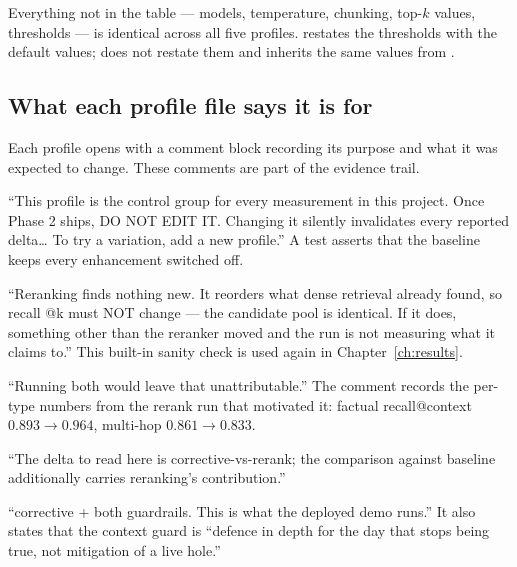 Everything not in the table --- models, temperature, chunking, top-$k$ values, thresholds --- is identical across all five profiles.  restates the thresholds with the default values;  does not restate them and inherits the same values from .

\subsection{What each profile file says it is for}

Each profile opens with a comment block recording its purpose and what it was expected to change. These comments are part of the evidence trail.

\begin{description}[style=nextline]
  \item[\code{baseline} --- the frozen control.] \enquote{This profile is the control group for every measurement in this project. Once Phase 2 ships, DO NOT EDIT IT. Changing it silently invalidates every reported delta\ldots{} To try a variation, add a new profile.} A test asserts that the baseline keeps every enhancement switched off.
  \item[\code{rerank} --- one flag.] \enquote{Reranking finds nothing new. It reorders what dense retrieval already found, so recall @k must NOT change --- the candidate pool is identical. If it does, something other than the reranker moved and the run is not measuring what it claims to.} This built-in sanity check is used again in Chapter~\ref{ch:results}.
  \item[\code{decompose} --- one flag, reranker deliberately off.] \enquote{Running both would leave that unattributable.} The comment records the per-type numbers from the rerank run that motivated it: factual recall@context $0.893 \rightarrow 0.964$, multi-hop $0.861 \rightarrow 0.833$.
  \item[\code{corrective} --- built on \code{rerank}.] \enquote{The delta to read here is corrective-vs-rerank; the comparison against baseline additionally carries reranking's contribution.}
  \item[\code{guarded} --- the shipped configuration.] \enquote{corrective + both guardrails. This is what the deployed demo runs.} It also states that the context guard is \enquote{defence in depth for the day that stops being true, not mitigation of a live hole.}
\end{description}

